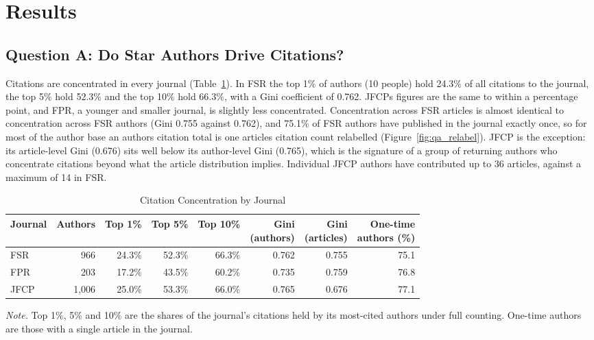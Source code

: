 \documentclass[11pt,a4paper]{article}
\newcommand{\tablenote}[1]{\par\smallskip\parbox{\linewidth}{\footnotesize\textit{Note.} #1}}
\begin{document}
\section{Results}\label{results}

\subsection{Question A: Do Star Authors Drive Citations?}\label{question-a-do-star-authors-drive-citations}

Citations are concentrated in every journal (Table~\ref{tab:qa_conc}). In FSR the top 1\% of authors (10 people) hold 24.3\% of all citations to the journal, the top 5\% hold 52.3\% and the top 10\% hold 66.3\%, with a Gini coefficient of 0.762. JFCP\textquotesingle s figures are the same to within a percentage point, and FPR, a younger and smaller journal, is slightly less concentrated. Concentration across FSR articles is almost identical to concentration across FSR authors (Gini 0.755 against 0.762), and 75.1\% of FSR authors have published in the journal exactly once, so for most of the author base an author\textquotesingle s citation total is one article\textquotesingle s citation count relabelled (Figure~\ref{fig:qa_relabel}). JFCP is the exception: its article-level Gini (0.676) sits well below its author-level Gini (0.765), which is the signature of a group of returning authors who concentrate citations beyond what the article distribution implies. Individual JFCP authors have contributed up to 36 articles, against a maximum of 14 in FSR.

\begin{table}[htbp]
\centering
\small
\caption{Citation Concentration by Journal}
\label{tab:qa_conc}
\begin{tabular}{lrrrrrrr}
\toprule
Journal & Authors & Top 1\% & Top 5\% & Top 10\% & \makecell[r]{Gini\\(authors)} & \makecell[r]{Gini\\(articles)} & \makecell[r]{One-time\\authors (\%)} \\
\midrule
FSR & 966 & 24.3\% & 52.3\% & 66.3\% & 0.762 & 0.755 & 75.1 \\
FPR & 203 & 17.2\% & 43.5\% & 60.2\% & 0.735 & 0.759 & 76.8 \\
JFCP & 1,006 & 25.0\% & 53.3\% & 66.0\% & 0.765 & 0.676 & 77.1 \\
\bottomrule
\end{tabular}
\tablenote{Top 1\%, 5\% and 10\% are the shares of the journal's citations held by its most-cited authors under full counting. One-time authors are those with a single article in the journal.}
\end{table}
\end{document}
